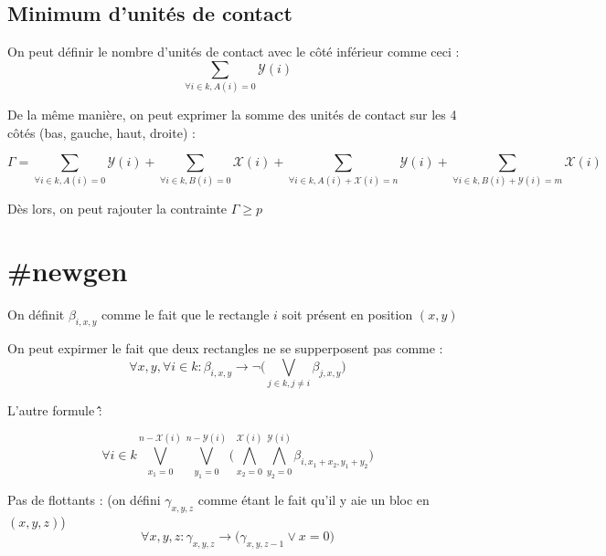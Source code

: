 \documentclass[a4paper]{article}
\begin{document}
\subsection{Minimum d'unités de contact}

On peut définir le nombre d'unités de contact avec le côté inférieur comme ceci :
$$
\sum_{\forall i \in k, A(i) = 0} \mathcal{Y}(i)
$$

De la même manière, on peut exprimer la somme des unités de contact sur les 4 côtés (bas, gauche, haut, droite) :

$$
\Gamma = \sum_{\forall i \in k, A(i) = 0} \mathcal{Y}(i) +
\sum_{\forall i \in k, B(i) = 0} \mathcal{X}(i) +
\sum_{\forall i \in k, A(i) + \mathcal{X}(i) =  n} \mathcal{Y}(i) +
\sum_{\forall i \in k, B(i) + \mathcal{Y}(i) = m} \mathcal{X}(i)
$$

Dès lors, on peut rajouter la contrainte $\Gamma \geq p$


\section{\#newgen}

On définit $\beta_{i, x, y}$ comme le fait que le rectangle $i$ soit présent en position $(x,y)$

On peut expirmer le fait que deux rectangles ne se supperposent pas comme : $$
\forall x,y , \forall i \in k : \beta_{i, x, y} \rightarrow
\lnot \Big( \bigvee_{j \in k, j \neq i} \beta_{j, x, y} \Big)
$$

L'autre formule \^\^ :

$$
\forall i \in k \bigvee_{x_1=0}^{n-\mathcal{X}(i)} \bigvee_{y_1=0}^{n-\mathcal{Y}(i)}
\Big(
  \bigwedge_{x_2=0}^{\mathcal{X}(i)} \bigwedge_{y_2=0}^{\mathcal{Y}(i)} \beta_{i, x_1 + x_2, y_1 + y_2}
\Big)
$$


Pas de flottants : (on défini $\gamma_{x, y , z}$ comme étant le fait qu'il y aie un bloc en $(x, y , z)$)
$$
\forall x,y,z : \gamma_{x, y, z} \rightarrow  \Big( \gamma_{x, y, z - 1}  \lor x = 0 \Big)
$$
\end{document}
